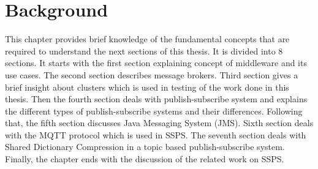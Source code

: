 \chapter{Background}\label{chapter:background}

This chapter provides brief knowledge of the fundamental concepts that are required to understand the next sections of this thesis. It is divided into 8 sections. It starts with the first section explaining concept of middleware and its use cases. The second section describes message brokers. Third section gives a brief insight about clusters which is used in testing of the work done in this thesis. Then the fourth section deals with publish-subscribe system and explains the different types of publish-subscribe systems and their differences. Following that, the fifth section discusses Java Messaging System (JMS). Sixth section deals with the MQTT protocol which is used in SSPS. The seventh section deals with Shared Dictionary Compression in a topic based publish-subscribe system. Finally, the chapter ends with the discussion of the related work on SSPS.
